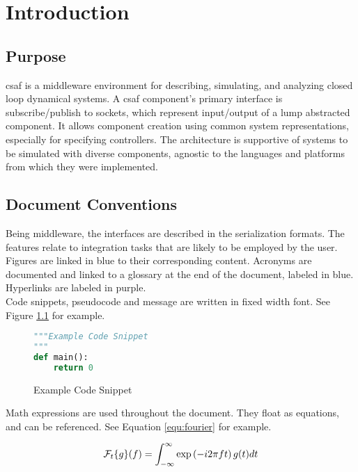 \chapter{Introduction}

\section{Purpose}
\acrshort{csaf} is a middleware environment for describing, simulating, and analyzing closed loop dynamical 
systems. A \acrshort{csaf} component's primary interface is subscribe/publish to sockets, which represent 
input/output of a lump abstracted component. It allows component creation using common system 
representations, especially for specifying controllers. The architecture is supportive of systems to be simulated with diverse components, agnostic to the languages and platforms from which they were implemented.


\section{Document Conventions}

Being middleware, the interfaces are described in the serialization formats. The features 
relate to integration tasks that are likely to be employed by the user. \\

Figures are linked in blue to their corresponding content. Acronyms are documented and linked to a glossary 
at the end of the document, labeled in blue. Hyperlinks are labeled in purple. \\

Code snippets, pseudocode and message are written in fixed width font. See Figure \ref{code:example} for 
example.

\begin{figure}[h]
\centering
\begin{lstlisting}[language=Python]
"""Example Code Snippet
"""
def main():
	return 0
\end{lstlisting}
\caption{Example Code Snippet}
\label{code:example}
\end{figure}

Math expressions are used throughout the document. They float as equations, and can be referenced. See 
Equation \ref{equ:fourier} for example.

\begin{equation} \label{equ:fourier}
\mathcal{F}_t\{g\}(f) = \int_{-\infty}^{\infty} \exp\left({-i 2\pi f t}\right) g(t) dt \\
\end{equation}


